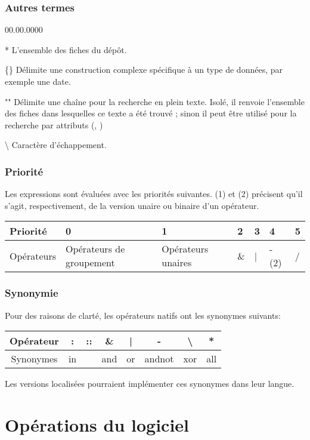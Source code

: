 \documentclass[11pt,french]{article}
\begin{document}
\subsubsection{Autres termes}
\begin{lyxlist}{00.00.0000}
\item [{{*}}] L'ensemble des fiches du dépôt. 
\item [{\{\quad{}\}}] Délimite une construction complexe spécifique à
un type de données, par exemple une date.
\item [{"\quad{}"}] Délimite une chaîne pour la recherche en plein texte.
Isolé, il renvoie l'ensemble des fiches dans lesquelles ce texte a
été trouvé ; sinon il peut être utilisé pour la recherche par attributs
(\code{:}, \code{::})
\item [{\textbackslash{}}] Caractère d'échappement.
\end{lyxlist}

\subsubsection{Priorité\label{sub:OperateursPriorite}}

Les expressions sont évaluées avec les priorités suivantes. (1) et
(2) précisent qu'il s'agit, respectivement, de la version unaire ou
binaire d'un opérateur.

\begin{tabular}{|l||l|l|l|l|l|l|}
\hline 
Priorité & 0 & 1 & 2 & 3 & 4 & 5\tabularnewline
\hline 
Opérateurs & Opérateurs de groupement & Opérateurs unaires & \& & | & - (2) & /\tabularnewline
\hline 
\end{tabular}


\subsubsection{Synonymie}

Pour des raisons de clarté, les opérateurs natifs ont les synonymes
suivants:

\begin{tabular}{|c||c|c|c|c|c|c|c|}
\hline 
Opérateur & : & :: & \& & | & - & \textbackslash{} & {*}\tabularnewline
\hline 
Synonymes & in &  & and & or & andnot & xor & all\tabularnewline
\hline 
\end{tabular}

Les versions localisées pourraient implémenter ces synonymes dans
leur langue.


\section{Opérations du logiciel}
\end{document}
